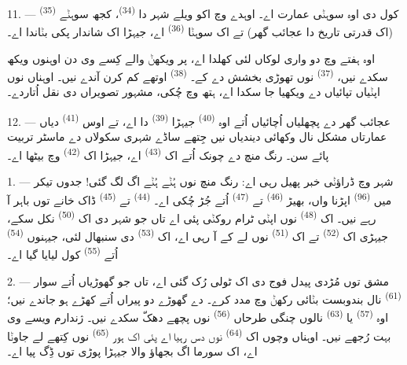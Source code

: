 11. --- کول دی اوہ سوہݨی عمارت  اے۔ اوہدے وچ اکو ویلے شہر دا
 \textsuperscript{(34)}، کجھ سوہݨے
 \textsuperscript{(35)} (اک قدرتی تاریخ دا عجائب گھر)
تے اک سوہݨا  \textsuperscript{(36)} اے، جیہڑا اک شاندار پکی
 بݨاندا اے۔

اوہ ہفتے وچ دو واری لوکاں لئی کھلدا اے، پر ویکھݨ والے کِسے وی دن اوہنوں ویکھ سکدے
نیں،  \textsuperscript{(37)} نوں تھوڑی بخشش دے کے۔ 
\textsuperscript{(38)} اوتھے کم کرن آندے نیں۔ اوہناں نوں اپݨیاں تپائیاں دے
 ویکھیا جا سکدا اے، ہتھ وچ  چُکی، مشہور تصویراں دی
نقل اُتاردے۔

12. --- عجائب گھر دے پچھلیاں اُچائیاں اُتے اوہ  \textsuperscript{(40)}
جیہڑا  \textsuperscript{(39)} دا اے، تے اوس
 \textsuperscript{(41)} دیاں عمارتاں مشکل نال وکھائی
دیندیاں نیں جِتھے ساڈے شہری سکولاں دے ماسٹر تربیت پائے سن۔ رنگ منچ دے چونک اُتے اک
 \textsuperscript{(43)} اے، جیہڑا اک 
\textsuperscript{(42)} وچ بیٹھا اے۔

\VUsaut{5.0mm}
\VUsaut{3.0mm}

\VUsaut{3.4mm}

1. --- شہر وچ ڈراؤݨی خبر پھیل رہی اے: رنگ منچ نوں ہُݨے ہُݨے اگ لگ گئی! جدوں تیکر
میں  \textsuperscript{(96)} اپڑنا واں، بھیڑ 
\textsuperscript{(46)} تے  \textsuperscript{(47)} اُتے جُڑ چُکی اے۔
 \textsuperscript{(44)} تے  \textsuperscript{(45)}
ڈاک خانے توں باہر آ رہے نیں۔ اک  \textsuperscript{(48)} نوں اپݨی
ٹرام روکݨی پئی اے تاں جو شہر دی اک  \textsuperscript{(50)} نکل سکے،
جیہڑی اک  \textsuperscript{(52)} تے اک  \textsuperscript{(51)}
نوں لے کے آ رہی اے، اک  \textsuperscript{(53)} دی سنبھال لئی، جیہنوں
 \textsuperscript{(54)} اُتے 
\textsuperscript{(55)} کول لیایا گیا اے۔

2. --- مشق توں مُڑدی پیدل فوج دی اک ٹولی رُک گئی اے، تاں جو گھوڑیاں اُتے سوار
 \textsuperscript{(61)} نال بندوبست بݨائی رکھݨ وچ مدد کرے۔
 دے گھوڑے دو پیراں اُتے کھڑے ہو جاندے نیں؛ اوہ 
\textsuperscript{(57)} یا  \textsuperscript{(63)} نالوں چنگی طرحاں
 \textsuperscript{(56)} نوں پچھے دھکّ سکدے نیں۔ ژندارم ویسے وی بہت
رُجھے نیں۔ اوہناں وچوں اک  \textsuperscript{(64)} نوں دس
رہیا اے پئی اک ہور  \textsuperscript{(65)} نوں کِتھے لے جاوݨا اے، اک
سورما اگ بجھاؤ والا جیہڑا پوڑی توں ڈِگ پیا اے۔

